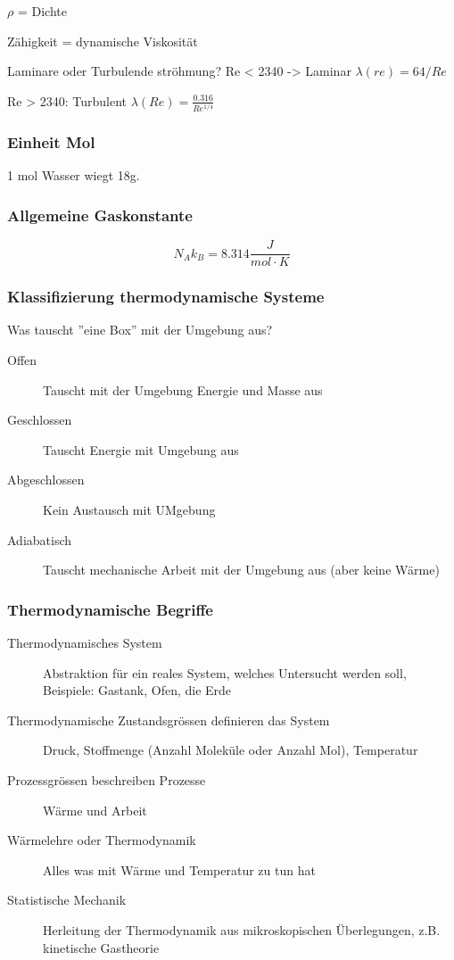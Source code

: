 \documentclass[a4paper]{scrartcl}
\begin{document}
$\rho$ = Dichte

Zähigkeit = dynamische Viskosität


Laminare oder Turbulende ströhmung? 
Re < 2340 -> Laminar
	$\lambda(re) = 64/Re$
	
Re > 2340: Turbulent
	$\lambda(Re) = \frac{0.316}{Re^{1/4}}$

\subsubsection{Einheit Mol}

1 mol Wasser wiegt 18g.

\subsubsection{Allgemeine Gaskonstante}

\[
	N_A k_B = 8.314 \frac{J}{mol \cdot K}
\]

\subsubsection{Klassifizierung thermodynamische Systeme}

Was tauscht ''eine Box'' mit der Umgebung aus?


\begin{description}
	\item[Offen] Tauscht mit der Umgebung Energie und Masse aus
	\item[Geschlossen] Tauscht Energie mit Umgebung aus
	\item[Abgeschlossen] Kein Austausch mit UMgebung
	\item[Adiabatisch] Tauscht mechanische Arbeit mit der Umgebung aus (aber keine Wärme)
\end{description}

\subsubsection{Thermodynamische Begriffe}

\begin{description}
	\item[Thermodynamisches System] Abstraktion für ein reales System, welches Untersucht werden soll, Beispiele: Gastank, Ofen, die Erde
	\item[Thermodynamische Zustandsgrössen definieren das System] Druck, Stoffmenge (Anzahl Moleküle oder Anzahl Mol), Temperatur
	\item[Prozessgrössen beschreiben Prozesse] Wärme und Arbeit
	\item[Wärmelehre oder Thermodynamik] Alles was mit Wärme und Temperatur zu tun hat
	\item[Statistische Mechanik] Herleitung der Thermodynamik aus mikroskopischen Überlegungen, z.B. kinetische Gastheorie
\end{description}
\end{document}
